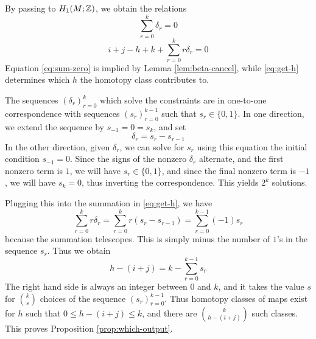 \documentclass[12pt]{amsart}
\begin{document}
By passing to $H_1(M;\mathbb{Z})$, we obtain
the relations
\begin{equation}
\label{eq:sum-zero}
  \sum_{r=0}^k \delta_r = 0
\end{equation}
\begin{equation}
\label{eq:get-h}
  i+j-h+k + \sum_{r=0}^k r\delta_r =0
\end{equation}
Equation \eqref{eq:sum-zero} is implied by Lemma \ref{lem:beta-cancel},
while \eqref{eq:get-h} determines which $h$ the homotopy class
contributes to.

The sequences $(\delta_r)_{r=0}^k$ which solve the constraints are in
one-to-one correspondence with sequences $(s_r)_{r=0}^{k-1}$ such that
$s_r \in \{0,1\}$. In one direction, we extend the sequence by $s_{-1}
= 0 = s_k$, and set
\begin{equation}
  \delta_r = s_r - s_{r-1}
\end{equation}
In the other direction, given $\delta_r$, we can solve for $s_r$ using
this equation the initial condition $s_{-1}=0$. Since
the signs of the nonzero $\delta_r$ alternate, and the first nonzero
term is $1$, we will have $s_r \in \{0,1\}$, and since the final
nonzero term is $-1$, we will have $s_k = 0$, thus inverting the
correspondence. This yields $2^k$ solutions.

Plugging this into the summation in \eqref{eq:get-h}, we have
\begin{equation}
  \sum_{r=0}^k r\delta_r = \sum_{r=0}^k r(s_r-s_{r-1}) =
  \sum_{r=0}^{k-1} (-1)s_r
\end{equation}
because the summation telescopes. This is simply minus the number of
$1$'s in the sequence $s_r$. Thus we obtain
\begin{equation}
  \label{eq:get-h-2}
  h-(i+j) = k - \sum_{r=0}^{k-1}s_r
\end{equation}
The right hand side is always an integer between $0$ and $k$, and it
takes the value $s$ for $\binom{k}{s}$ choices of the sequence
$(s_r)_{r=0}^{k-1}$. Thus homotopy classes of maps exist for $h$ such
that $0 \leq h-(i+j) \leq k$, and there are $\binom{k}{h-(i+j)}$ such
classes. This proves Proposition \ref{prop:which-output}.
\end{document}
